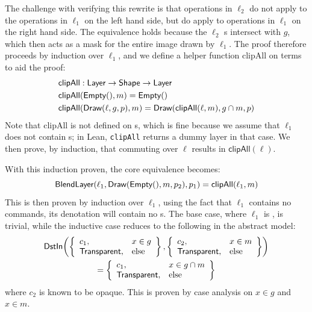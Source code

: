 \documentclass[main.tex]{subfiles}
\begin{document}
The challenge with verifying this rewrite
  is that \Clip operations in $\ell_2$
  do not apply to the operations in $\ell_1$ on the left hand side,
  but do apply to operations in $\ell_1$ on the right hand side.
The equivalence holds because
  the $\ell_2$ \Clip{}s intersect with $g$,
  which then acts as a mask for the entire image drawn by $\ell_1$.
The proof therefore proceeds by induction over $\ell_1$,
  and we define a helper function \textsf{clipAll} on \Layer terms to aid the proof:
\begin{align*}
  &\mathsf{clipAll} : \textsf{Layer} \to \textsf{Shape} \to \textsf{Layer} \\
  &\mathsf{clipAll}(\textsf{Empty}(), m) = \textsf{Empty}() \\
  &\mathsf{clipAll}(\textsf{Draw}(\ell, g, p), m)
                   = \textsf{Draw}(\mathsf{clipAll}(\ell, m), g \cap m, p)
\end{align*}
Note that \textsf{clipAll} is not defined
  on \BlendLayer{}s,
  which is fine because we assume that $\ell_1$
  does not contain \SaveLayer{}s;
  in Lean, \texttt{clipAll} returns a dummy layer in that case.
We then prove, by induction,
  that commuting \Clip over $\ell$ results in $\mathsf{clipAll}(\ell)$.

With this induction proven,
  the core \Layer equivalence becomes:
\begin{equation*}
\textsf{BlendLayer}(\ell_1, \textsf{Draw}(\textsf{Empty}(), m, p_2), p_1) = \mathsf{clipAll}(\ell_1, m)
\end{equation*}
This is then proven by induction over $\ell_1$,
  using the fact that
  $\ell_1$ contains no \SaveLayer commands,
  its denotation will contain no \BlendLayer{}s.
The base case, where $\ell_1$ is \Empty, is trivial,
  while the inductive case reduces to the following
  in the abstract model:
\begin{gather*}
\textsf{DstIn}\!\left(
\left\{
\begin{array}{ll}
  c_1, & x \in g \\
  \mathsf{Transparent}, & \text{else}
\end{array}
\right\},
\left\{
\begin{array}{ll}
  c_2, & x \in m \\
  \mathsf{Transparent}, & \text{else}
\end{array}
\right\}
\right)\\
=
\left\{
\begin{array}{ll}
  c_1, & x \in g \cap m \\
  \mathsf{Transparent}, & \text{else}
\end{array}
\right\}
\end{gather*}
  where $c_2$ is known to be opaque.
This is proven by case analysis on $x \in g$ and $x \in m$.
\end{document}
